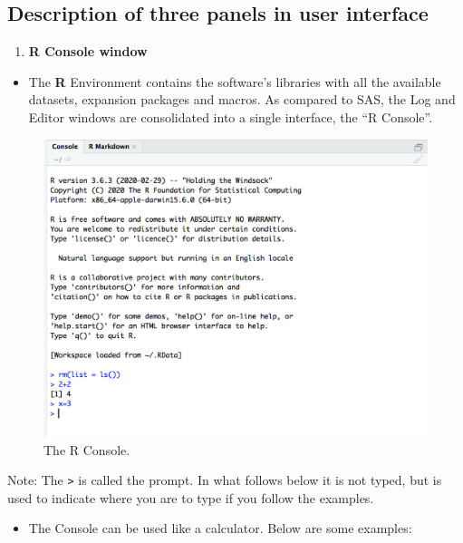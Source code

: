 \documentclass[]{book}
\providecommand{\tightlist}{%
  \setlength{\itemsep}{0pt}\setlength{\parskip}{0pt}}
\begin{document}
\subsection{Description of three panels in user
interface}\label{description-of-three-panels-in-user-interface}

\begin{enumerate}
\def\labelenumi{\arabic{enumi}.}
\tightlist
\item
  \textbf{R Console window}
\end{enumerate}

\begin{itemize}
\tightlist
\item
  The \textbf{R} Environment contains the software's libraries with all
  the available datasets, expansion packages and macros. As compared to
  SAS, the Log and Editor windows are consolidated into a single
  interface, the ``R Console''.
\end{itemize}

\begin{figure}

{\centering \includegraphics[width=0.8\linewidth]{figures/Rconsole2} 

}

\caption{The R Console.}\label{fig:Rconsole2}
\end{figure}

Note: The \texttt{\textgreater{}} is called the prompt. In what follows
below it is not typed, but is used to indicate where you are to type if
you follow the examples.

\begin{itemize}
\tightlist
\item
  The Console can be used like a calculator. Below are some examples:
\end{itemize}
\end{document}
